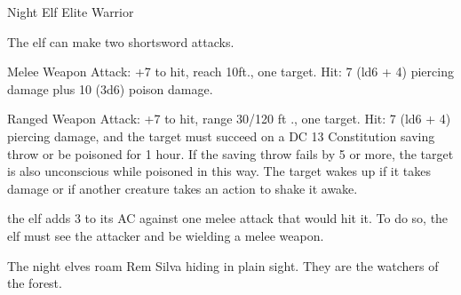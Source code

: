 \documentclass[letterpaper,10pt,twoside,twocolumn,openany]{book}
\begin{document}
\begin{monsterbox}{Night Elf Elite Warrior}
	\begin{monsteraction}[Multiattack]
		The elf can make two shortsword attacks.
	\end{monsteraction}
	\begin{monsteraction}[Shortsword]
		Melee Weapon Attack: +7 to hit, reach 10ft., one target. Hit: 7 (ld6 + 4) piercing damage plus 10 (3d6) poison damage.
	\end{monsteraction}
	\begin{monsteraction}
		Ranged Weapon Attack: +7 to hit, range 30/120 ft ., one target. Hit: 7 (ld6 + 4) piercing damage, and the target must succeed on a DC 13 Constitution saving throw or	be poisoned for 1 hour. If the saving throw fails by 5 or more,	the target is also unconscious while poisoned in this way. The target wakes up if it takes damage or if another creature takes an action to shake it awake.
	\end{monsteraction}
	\begin{monsteraction}[Parry]
		the elf adds 3 to its AC against one melee attack that would hit it. To do so, the elf must see the attacker and be
		wielding a melee weapon.
	\end{monsteraction}
		The night elves roam Rem Silva hiding in plain sight. They are the watchers of the forest. 
\end{monsterbox}
\end{document}
